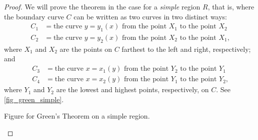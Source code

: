 \begin{proof}
 We will prove the theorem in the case for a \emph{simple} region $R$, that is, where the boundary curve $C$ can be written as two curves in two distinct ways:
 \begin{align}
  C_1 &= \text{the curve $y = y_1(x)$ from the point $X_1$ to the point $X_2$} \label{green_bottom}\\
  C_2 &= \text{the curve $y = y_2(x)$ from the point $X_2$ to the point $X_1$,}\label{green_top}
 \end{align}
 where $X_1$ and $X_2$ are the points on $C$ farthest to the left and right, respectively; and
 \begin{align}
  C_3 &= \text{the curve $x = x_1(y)$ from the point $Y_2$ to the point $Y_1$}\label{green_left}\\
  C_4 &= \text{the curve $x = x_2(y)$ from the point $Y_1$ to the point $Y_2$,}\label{green_right}
 \end{align}
 where $Y_1$ and $Y_2$ are the lowest and highest points, respectively, on $C$.
 See \autoref{fig_green_simple}.

\noindent\begin{minipage}[t]{\linewidth}\noindent%
\captionsetup{type=figure}%
 \centering
 \caption{Figure for Green's Theorem on a simple region.}
 \label{fig_green_simple}
 \end{minipage}


\end{proof}
